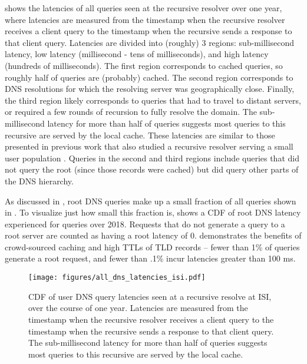 \documentclass[sigconf,letterpaper,nonacm,10pt,anonymous]{acmart}
\begin{document}
 shows the latencies of all queries seen
at the recursive resolver over one year, where latencies are measured
from the timestamp when the recursive resolver receives a client query
to the timestamp when the recursive sends a response to that client
query. Latencies are divided into (roughly) 3 regions: sub-millisecond
latency, low latency (millisecond - tens of milliseconds), and high
latency (hundreds of milliseconds). The first region corresponds to
cached queries, so roughly half of queries are (probably) cached. The
second region corresponds to DNS resolutions for which the resolving
server was geographically close. Finally, the third region likely
corresponds to queries that had to travel to distant servers, or
required a few rounds of recursion to fully resolve the domain. The
sub-millisecond latency for more than half of queries suggests most
queries to this recursive are served by the local cache. These latencies
are similar to those presented in previous work that also studied a
recursive resolver serving a small user population
\cite{callahan2013modern}. Queries in the second and third regions
include queries that did not query the root (since those records were
cached) but did query other parts of the DNS hierarchy.

As discussed in , root DNS queries make up a
small fraction of all queries shown in .
To visualize just how small this fraction is,
 shows a CDF of root DNS latency
experienced for queries over 2018. Requests that do not generate a query
to a root server are counted as having a root latency of 0.
 demonstrates the benefits of
crowd-sourced caching and high TTLs of TLD records -- fewer than 1\% of
queries generate a root request, and fewer than .1\% incur latencies
greater than 100 ms.

\begin{figure}
    \centering
    \texttt{[image: figures/all\_dns\_latencies\_isi.pdf]}
    \caption{CDF of user DNS query latencies seen at a recursive resolve at ISI, over the course of one year. Latencies are measured from the timestamp when the recursive resolver receives a client query to the timestamp when the recursive sends a response to that client query. The sub-millisecond latency for more than half of queries suggests most queries to this recursive are served by the local cache. }
    \label{fig:all_dns_latencies_isi}
\end{figure}
\end{document}
